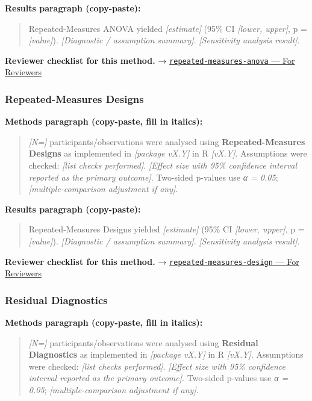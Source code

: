 \documentclass[
]{article}
\begin{document}
\textbf{Results paragraph (copy-paste):}

\begin{quote}
Repeated-Measures ANOVA yielded \emph{{[}estimate{]}} (95\% CI
\emph{{[}lower, upper{]}}, p = \emph{{[}value{]}}). \emph{{[}Diagnostic
/ assumption summary{]}}. \emph{{[}Sensitivity analysis result{]}}.
\end{quote}

\textbf{Reviewer checklist for this method.} →
\href{../chapters/04-inferential/repeated-measures-anova.Rmd\#for-reviewers}{\texttt{repeated-measures-anova}
--- For Reviewers}

\subsubsection{Repeated-Measures
Designs}\label{repeated-measures-designs}

\textbf{Methods paragraph (copy-paste, fill in italics):}

\begin{quote}
\emph{{[}N={]}} participants/observations were analysed using
\textbf{Repeated-Measures Designs} as implemented in \emph{{[}package
vX.Y{]}} in R \emph{{[}vX.Y{]}}. Assumptions were checked: \emph{{[}list
checks performed{]}}. \emph{{[}Effect size with 95\% confidence interval
reported as the primary outcome{]}}. Two-sided p-values use \emph{α =
0.05}; \emph{{[}multiple-comparison adjustment if any{]}}.
\end{quote}

\textbf{Results paragraph (copy-paste):}

\begin{quote}
Repeated-Measures Designs yielded \emph{{[}estimate{]}} (95\% CI
\emph{{[}lower, upper{]}}, p = \emph{{[}value{]}}). \emph{{[}Diagnostic
/ assumption summary{]}}. \emph{{[}Sensitivity analysis result{]}}.
\end{quote}

\textbf{Reviewer checklist for this method.} →
\href{../chapters/16-design/repeated-measures-design.Rmd\#for-reviewers}{\texttt{repeated-measures-design}
--- For Reviewers}

\subsubsection{Residual Diagnostics}\label{residual-diagnostics}

\textbf{Methods paragraph (copy-paste, fill in italics):}

\begin{quote}
\emph{{[}N={]}} participants/observations were analysed using
\textbf{Residual Diagnostics} as implemented in \emph{{[}package
vX.Y{]}} in R \emph{{[}vX.Y{]}}. Assumptions were checked: \emph{{[}list
checks performed{]}}. \emph{{[}Effect size with 95\% confidence interval
reported as the primary outcome{]}}. Two-sided p-values use \emph{α =
0.05}; \emph{{[}multiple-comparison adjustment if any{]}}.
\end{quote}
\end{document}
